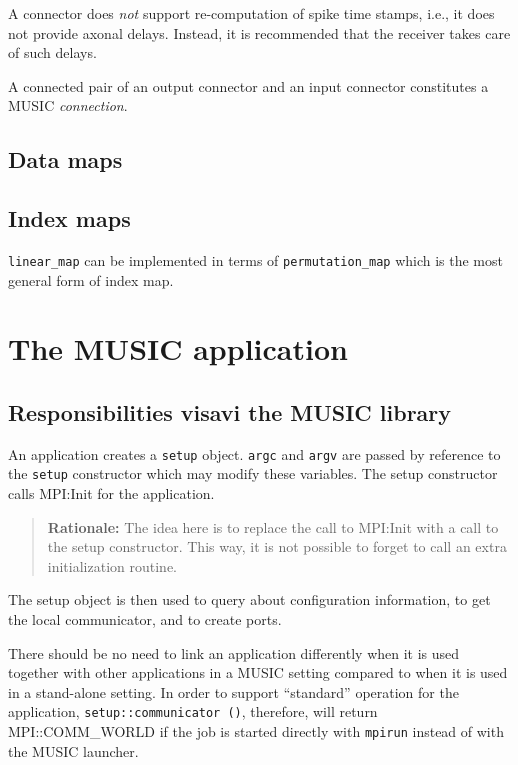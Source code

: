 \documentclass[a4paper]{report}
\newenvironment{rationale}%
{\par\begin{quote}\textbf{Rationale:}}%
{\par\end{quote}}
\begin{document}
\begin{metatext}
A connector does \emph{not} support re-computation of spike time
stamps, i.e., it does not provide axonal delays.  Instead, it is
recommended that the receiver takes care of such delays.

A connected pair of an output connector and an input connector
constitutes a MUSIC \emph{connection}.

\subsection{Data maps}

\subsection{Index maps}

\lstinline|linear_map| can be implemented in terms of
\lstinline|permutation_map| which is the most general form of index map.

\section{The MUSIC application}

\subsection{Responsibilities visavi the MUSIC library}
\label{sec:responsibilities}

An application creates a \lstinline|setup| object.  \lstinline|argc|
and \lstinline|argv| are passed by reference to the \lstinline|setup|
constructor which may modify these variables.  The setup constructor
calls MPI:Init for the application.

\begin{rationale}
  The idea here is to replace the call to MPI:Init with a call to the
  setup constructor.  This way, it is not possible to forget to call
  an extra initialization routine.
\end{rationale}

The setup object is then used to query about configuration
information, to get the local communicator, and to create ports.

There should be no need to link an application differently when it is
used together with other applications in a MUSIC setting compared to
when it is used in a stand-alone setting.  In order to support
``standard'' operation for the application,
\lstinline|setup::communicator ()|, therefore, will return
MPI::COMM\_WORLD if the job is started directly with
\lstinline|mpirun| instead of with the MUSIC launcher.


\end{metatext}
\end{document}
